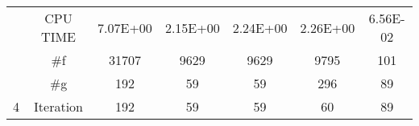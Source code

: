 \documentclass{article}
\begin{document}
\begin{table}[H]
\begin{tabular}{|c|c|c|c|c|c|c|}
			& CPU TIME  & {\color[HTML]{000000} 7.07E+00} & {\color[HTML]{000000} 2.15E+00} & {\color[HTML]{000000} 2.24E+00} & {\color[HTML]{000000} 2.26E+00} & {\color[HTML]{000000} 6.56E-02} \\ \cline{2-7} 
			& \#f       & {\color[HTML]{000000} 31707}    & {\color[HTML]{000000} 9629}     & {\color[HTML]{000000} 9629}     & {\color[HTML]{000000} 9795}     & {\color[HTML]{000000} 101}      \\ \cline{2-7} 
			& \#g       & {\color[HTML]{000000} 192}      & {\color[HTML]{000000} 59}       & {\color[HTML]{000000} 59}       & {\color[HTML]{000000} 296}      & {\color[HTML]{000000} 89}       \\ \cline{2-7} 
			\multirow{-4}{*}{4} & Iteration & {\color[HTML]{000000} 192}      & {\color[HTML]{000000} 59}       & {\color[HTML]{000000} 59}       & {\color[HTML]{000000} 60}       & {\color[HTML]{000000} 89}       \\ \hline
		\end{tabular}
	\end{table}
\end{document}
